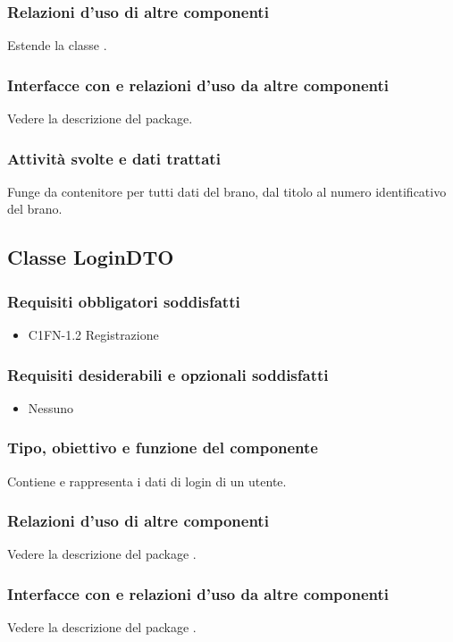 \subsubsection*{Relazioni d'uso di altre componenti}
Estende la classe .
\subsubsection*{Interfacce con e relazioni d'uso da altre componenti}
Vedere la descrizione del package.
\subsubsection*{Attivit\`a svolte e dati trattati}
Funge da contenitore per tutti dati del brano, dal titolo al numero
identificativo del brano. 

\subsection{Classe LoginDTO}
\subsubsection*{Requisiti obbligatori soddisfatti}
\begin{itemize}
	\item C1FN-1.2 Registrazione
\end{itemize}
\subsubsection*{Requisiti desiderabili e opzionali soddisfatti}
\begin{itemize}
    \item Nessuno
\end{itemize}
\subsubsection*{Tipo, obiettivo e funzione del componente}
Contiene e rappresenta i dati di login di un utente.
\subsubsection*{Relazioni d'uso di altre componenti}
Vedere la descrizione del package .
\subsubsection*{Interfacce con e relazioni d'uso da altre componenti}
Vedere la descrizione del package .
